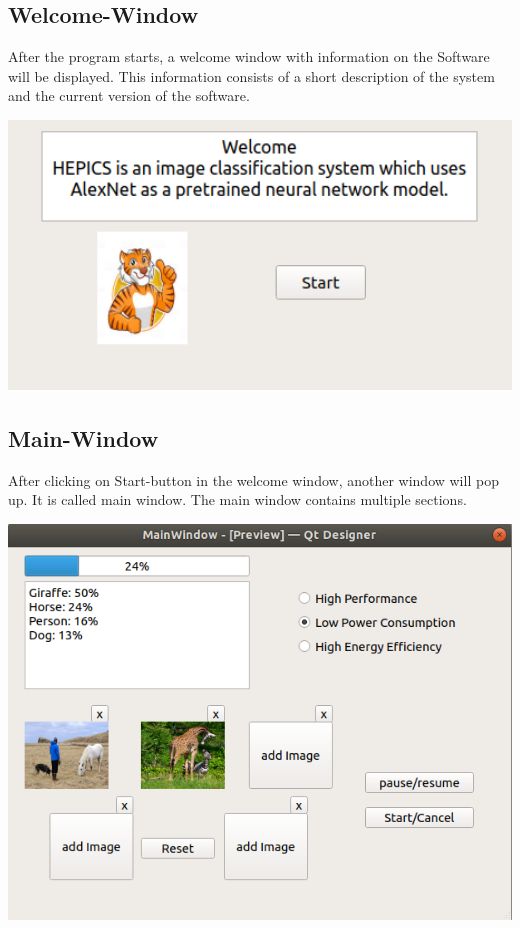 \documentclass[parskip=full]{scrartcl}
\begin{document}
\subsection {Welcome-Window}

After the program starts, a welcome window with information on the Software will be displayed. This information consists of a short description of the  system and the current version of the software.

\begin{center}
\includegraphics[width=1.0\textwidth]{images/WelcomeWindow.png}
\end{center}

\pagebreak



\subsection {Main-Window}

After clicking on Start-button in the welcome window, another window will pop up. It is called main window. The main window contains multiple sections.

\begin{center}
\includegraphics[width=1.0\textwidth]{images/MainWindow.png}
\end{center}
\end{document}
